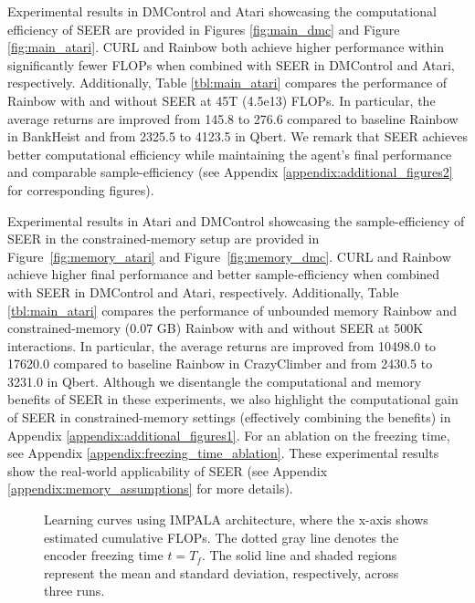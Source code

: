 \documentclass{article}
\begin{document}
Experimental results in DMControl and Atari showcasing the computational efficiency of SEER are provided in Figures \ref{fig:main_dmc} and Figure \ref{fig:main_atari}. 
CURL and Rainbow both achieve higher performance within significantly fewer FLOPs when combined with SEER in DMControl and Atari, respectively.
Additionally, Table \ref{tbl:main_atari} compares the performance of Rainbow with and without SEER at 45T (4.5e13) FLOPs. In particular, the average returns are improved from 145.8 to 276.6 compared to baseline Rainbow in BankHeist and from 2325.5 to 4123.5 in Qbert. We remark that SEER achieves better computational efficiency while maintaining the agent's final performance and comparable sample-efficiency (see Appendix \ref{appendix:additional_figures2} for corresponding figures).

Experimental results in Atari and DMControl showcasing the sample-efficiency of SEER in the constrained-memory setup are provided in Figure~\ref{fig:memory_atari} and Figure~\ref{fig:memory_dmc}. CURL and Rainbow achieve higher final performance and better sample-efficiency when combined with SEER in DMControl and Atari, respectively. 
Additionally, Table \ref{tbl:main_atari} compares the performance of unbounded memory Rainbow and constrained-memory (0.07 GB) Rainbow with and without SEER at 500K interactions. In particular, the average returns are improved from 10498.0 to 17620.0 compared to baseline Rainbow in CrazyClimber and from 2430.5 to 3231.0 in Qbert.
Although we disentangle the computational and memory benefits of SEER in these experiments, 
we also highlight the computational gain of SEER in constrained-memory settings (effectively combining the benefits) in Appendix \ref{appendix:additional_figures1}. For an ablation on the freezing time, see Appendix \ref{appendix:freezing_time_ablation}.
These experimental results show the real-world applicability of SEER (see Appendix \ref{appendix:memory_assumptions} for more details).


\begin{figure*} [t] \centering
{} 
\caption{Learning curves using IMPALA architecture, where the x-axis shows estimated cumulative FLOPs. The dotted gray line denotes the encoder freezing time $t=T_f$. The solid line and shaded regions represent the mean and standard deviation, respectively, across three runs.}
\end{figure*} \label{fig:impala_plots}
\end{document}
